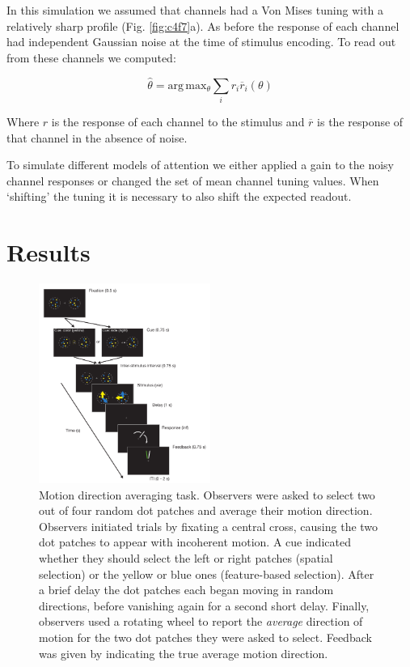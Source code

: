 In this simulation we assumed that channels had a Von Mises tuning with a relatively sharp profile (Fig. \ref{fig:c4f7}a). As before the response of each channel had independent Gaussian noise at the time of stimulus encoding. To read out from these channels we computed:

\begin{equation}
    \hat{\theta} = \mathrm{arg}\,\mathrm{max}_{\theta} \sum_{i} r_i \overline{r}_i (\theta)
    \label{eqn:c5readout}
\end{equation}

Where $r$ is the response of each channel to the stimulus and $\overline{r}$ is the response of that channel in the absence of noise. 

To simulate different models of attention we either applied a gain to the noisy channel responses or changed the set of mean channel tuning values. When `shifting' the tuning it is necessary to also shift the expected readout. 

\section{Results}

\begin{figure}
\centering
\includegraphics[keepaspectratio,width=0.50\textwidth]{figs_c4/f1_task.pdf}
\caption[Averaging task]{Motion direction averaging task. Observers were asked to select two out of four random dot patches and average their motion direction. Observers initiated trials by fixating a central cross, causing the two dot patches to appear with incoherent motion. A cue indicated whether they should select the left or right patches (spatial selection) or the yellow or blue ones (feature-based selection). After a brief delay the dot patches each began moving in random directions, before vanishing again for a second short delay. Finally, observers used a rotating wheel to report the \textit{average} direction of motion for the two dot patches they were asked to select. Feedback was given by indicating the true average motion direction.}
\label{fig:c4f1}
\end{figure}

